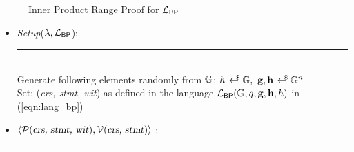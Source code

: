 \begin{figure}[h!]
\caption{Inner Product Range Proof for $\mathcal{L}_{\textsf{BP}}$}
\label{fig:protocol_BP}
\end{figure}
\vspace{-12pt}
\begin{mdframed}
\begin{itemize}[itemsep=4pt]
    \item[] \textsl{Setup}($\lambda, \mathcal{L}_{\textsf{BP}}$):
    \\[-5pt]\rule{\textwidth}{0.4pt}\\ 
    Generate following elements randomly from $\mathbb{G}$: $h \rgen \G, \ \textbf{g}, \textbf{h} \rgen \G^{n}$
    \\[2pt]
    Set: (\textsl{crs, stmt, wit}) as defined in the language $\mathcal{L}_{\textsf{BP}}(\mathbb{G}, q, \textbf{g}, \textbf{h}, h)$ in (\ref{eqn:lang_bp})
    \vspace{2pt}

    \item[] $\langle \mathcal{P}(\textsl{crs, stmt, wit}), \mathcal{V}(\textsl{crs, stmt}) \rangle$ :
    \\[-5pt]\rule{\textwidth}{0.4pt}


    
        


\end{itemize}
\end{mdframed}
